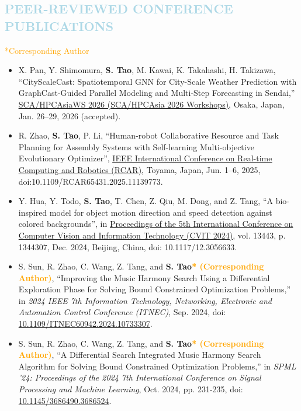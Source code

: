 \documentclass[11pt,a4paper,sans]{moderncv}
\makeatletter
\renewcommand{\underline}[1]{\uline{#1}}
\newcommand*{\customcventry}[7][.13em]{
\begin{tabular}{@{}l}
{\bfseries #4} \
{\itshape #3}
\end{tabular}
\hfill
\begin{tabular}{l@{}}
{\bfseries #5} \
{\itshape #2}
\end{tabular}
\ifx&#7&%
\else{\
\begin{minipage}{\maincolumnwidth}%
\small#7%
\end{minipage}}\fi%
\par\addvspace{#1}}
\makeatother
\begin{document}
\subsection{\textcolor{lightblue}{PEER-REVIEWED CONFERENCE PUBLICATIONS}}
\textcolor{orange}{*Corresponding Author}
{\begin{itemize}[label=\textbullet]


      \item [15)] X. Pan, Y. Shimomura, \textbf{S. Tao}, M. Kawai, K. Takahashi, H. Takizawa, “CityScaleCast: Spatiotemporal GNN for City-Scale Weather Prediction with GraphCast-Guided Parallel Modeling and Multi-Step Forecasting in Sendai,” \color{black}\href{https://doi.org/}{\underline{SCA/HPCAsiaWS 2026 (SCA/HPCAsia 2026 Workshops)}}, Osaka, Japan, Jan. 26–29, 2026 (accepted).
      
      \item [14)] R. Zhao, \textbf{S. Tao}, P. Li, “Human-robot Collaborative Resource and Task Planning for Assembly Systems with Self-learning Multi-objective Evolutionary Optimizer”, \color{black}\href{https://ieeexplore.ieee.org/xpl/conhome/11139128/proceeding}{\underline{IEEE International Conference on Real-time Computing and Robotics (RCAR)}}, Toyama, Japan, Jun. 1–6, 2025, doi:10.1109/RCAR65431.2025.11139773.
            
      \item [13)] Y. Hua, Y. Todo, \textbf{S. Tao}, T. Chen, Z. Qiu, M. Dong, and Z. Tang, “A bio-inspired model for object motion direction and speed detection against colored backgrounds”, in \color{black}\href{https://doi.org/10.1117/12.3056633}{Proceedings of the 5th International Conference on Computer Vision and Information Technology (CVIT 2024)}, vol. 13443, p. 1344307, Dec. 2024, Beijing, China, doi: 10.1117/12.3056633.


      \item[12)] S. Sun, R. Zhao, C. Wang, Z. Tang, and \textbf{S. Tao\textcolor{orange}{* (Corresponding Author)}}, “Improving the Music Harmony Search Using a Differential Exploration Phase for Solving Bound Constrained Optimization Problems,” in \textit{2024 IEEE 7th Information Technology, Networking, Electronic and Automation Control Conference (ITNEC)}, Sep. 2024, doi: \href{https://doi.org/10.1109/ITNEC60942.2024.10733307}{10.1109/ITNEC60942.2024.10733307}.
 
      
      \item [11)] S. Sun, R. Zhao, C. Wang, Z. Tang, and \textbf{S. Tao\textcolor{orange}{* (Corresponding Author)}}, “A Differential Search Integrated Music Harmony Search Algorithm for Solving Bound Constrained Optimization Problems,” in \textit{SPML '24: Proceedings of the 2024 7th International Conference on Signal Processing and Machine Learning}, Oct. 2024, pp. 231-235, doi: \href{https://doi.org/10.1145/3686490.3686524}{10.1145/3686490.3686524}.
      

\end{itemize}}
\end{document}
